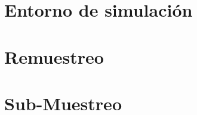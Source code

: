 

\pagebreak

\section{Entorno de simulación}
	\label{Ejercicio-5}
	
	
\pagebreak

%	
%	

\section{Remuestreo}
	\label{Ejercicio-7}
	
	
\pagebreak	
\section{Sub-Muestreo}
	\label{Ejercicio-8}
	
	
